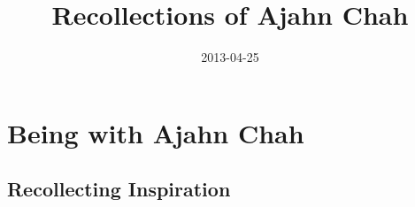 \documentclass[
  pagePreset=smallpage,
  babelLanguage=british,
]{aruno-anecdote}
\title{Recollections of Ajahn Chah}
\subtitle{}
\author{}
\date{2013-04-25}
\begin{document}

\frontmatter


\cleartorecto
\thispagestyle{empty}



\cleartoverso
\thispagestyle{empty}



\cleartorecto
\thispagestyle{empty}



\tableofcontents


\mainmatter


\part{Being with Ajahn Chah}
\chapter{Recollecting Inspiration}


%
%
%
%
%
\end{document}
